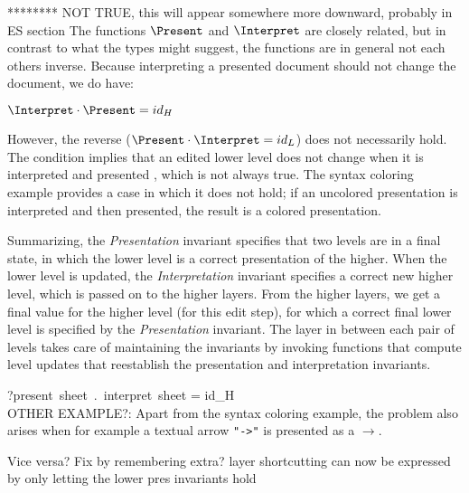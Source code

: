 \bc
{}
******** NOT TRUE, this will appear somewhere more downward, probably in ES section
The functions $\Present$ and $\Interpret$ are closely related, but in contrast to what the types might suggest, the functions are in general not each others inverse. Because interpreting a presented document should not change the document, we do have: 

\begin{small}\begin{math}
\Interpret \cdot \Present = id_{H}
\end{math}\end{small}


However, the reverse ($\Present \cdot \Interpret = id_{L}$) does not necessarily hold. The condition implies that an edited lower level does not change when it is interpreted and presented , which is not always true. The syntax coloring example provides a case in which it does not hold; if an uncolored presentation is interpreted and then presented, the result is a colored presentation. 
\ec

Summarizing, the {\em Presentation} invariant specifies that two levels are in a final state, in which the lower level is a correct presentation of the higher. When the lower level is updated, the {\em Interpretation} invariant specifies a correct new higher level, which is passed on to the higher layers. From the higher layers, we get a final value for the higher level (for this edit step), for which a correct final lower level is specified by the {\em Presentation} invariant. The layer in between each pair of levels takes care of maintaining the invariants by invoking functions that compute level updates that reestablish the presentation and interpretation invariants.


\bc
?present~sheet~.~interpret~sheet = id_{H}\\

OTHER EXAMPLE?: Apart from the syntax coloring example, the problem also arises when for example a textual arrow 
\verb|"->"| is presented as a $\rightarrow$. 

Vice versa? Fix by remembering extra?
 layer shortcutting can now be expressed by only letting the lower pres invariants hold

